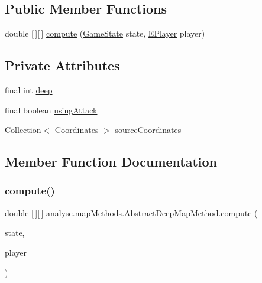 \subsection*{Public Member Functions}
\begin{DoxyCompactItemize}
\item 
double \mbox{[}$\,$\mbox{]}\mbox{[}$\,$\mbox{]} \mbox{\hyperlink{classanalyse_1_1map_methods_1_1_abstract_deep_map_method_a02252e0eb987838131c5586ab775b849}{compute}} (\mbox{\hyperlink{classgame_1_1game_state_1_1_game_state}{Game\+State}} state, \mbox{\hyperlink{enumgame_1_1_e_player}{E\+Player}} player)
\end{DoxyCompactItemize}
\subsection*{Private Attributes}
\begin{DoxyCompactItemize}
\item 
final int \mbox{\hyperlink{classanalyse_1_1map_methods_1_1_abstract_deep_map_method_a90ee3a39a212a9cc99f22913cc8809a5}{deep}}
\item 
final boolean \mbox{\hyperlink{classanalyse_1_1map_methods_1_1_abstract_deep_map_method_a08461139a177dd9ce0614252b4d025e0}{using\+Attack}}
\item 
Collection$<$ \mbox{\hyperlink{classrule_engine_1_1_coordinates}{Coordinates}} $>$ \mbox{\hyperlink{classanalyse_1_1map_methods_1_1_abstract_deep_map_method_a348890cd3ae8321c22eafcb0645e8423}{source\+Coordinates}}
\end{DoxyCompactItemize}


\subsection{Member Function Documentation}
\mbox{\label{classanalyse_1_1map_methods_1_1_abstract_deep_map_method_a02252e0eb987838131c5586ab775b849}} 
\subsubsection{\texorpdfstring{compute()}{compute()}}
{\footnotesize\ttfamily double \mbox{[}$\,$\mbox{]}\mbox{[}$\,$\mbox{]} analyse.\+map\+Methods.\+Abstract\+Deep\+Map\+Method.\+compute (\begin{DoxyParamCaption}\item[{\mbox{\hyperlink{classgame_1_1game_state_1_1_game_state}{Game\+State}}}]{state,  }\item[{\mbox{\hyperlink{enumgame_1_1_e_player}{E\+Player}}}]{player }\end{DoxyParamCaption})\hspace{0.3cm}{\ttfamily [inline]}}



